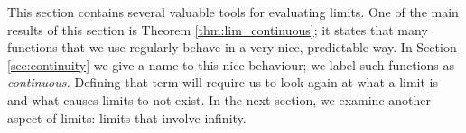 This section contains several valuable tools for evaluating limits. One of the main results of this section is Theorem \ref{thm:lim_continuous}; it states that many functions that we use regularly behave in a very nice, predictable way. In Section \ref{sec:continuity} we give a name to this nice behaviour; we label such functions as \textit{continuous.} Defining that term will require us to look again at what a limit is and what causes limits to not exist. In the next section, we examine another aspect of limits: limits that involve infinity.

{}